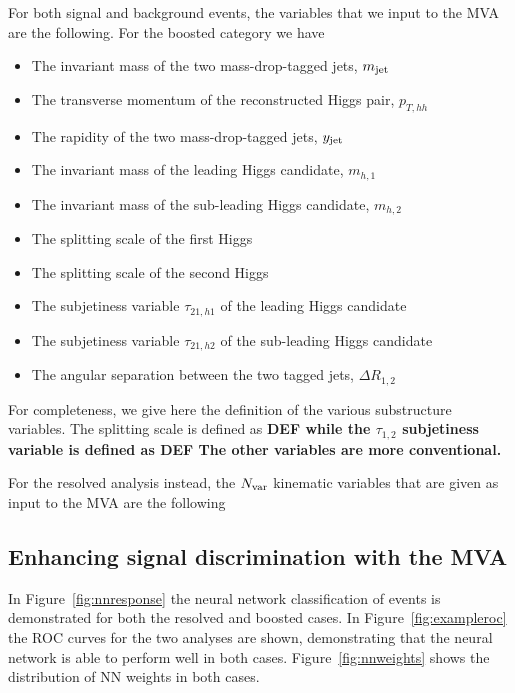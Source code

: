 For both signal and background events, the variables that we input
to the MVA are the following.
%
For the boosted category we have
\begin{itemize}
\item The invariant mass of the two mass-drop-tagged jets, $m_{\rm jet}$
\item The transverse momentum of the reconstructed Higgs pair, $p_{T,hh}$
\item The rapidity of the two mass-drop-tagged jets, $y_{\rm jet}$
\item The invariant mass of the leading Higgs candidate, $m_{h,1}$
\item The invariant mass of the sub-leading Higgs candidate, $m_{h,2}$
\item The splitting scale of the first Higgs
\item The splitting scale of the second Higgs
\item The subjetiness variable $\tau_{21,h1}$ of the leading Higgs candidate
\item The subjetiness variable $\tau_{21,h2}$
  of the sub-leading Higgs candidate
 \item The angular separation between the two tagged jets, $\Delta R_{1,2}$ 
\end{itemize}
For completeness, we give here the definition of the various substructure variables.
%
The splitting scale is defined as
\be
\bf DEF
\ee
while the $\tau_{1,2}$ subjetiness variable is defined as
\be
\bf DEF
\ee
The other variables are more conventional.

For the resolved analysis instead, the $N_{\rm var}$ kinematic variables
that are given as input to the MVA are the following
\begin{itemize}

  \end{itemize}

\subsection{Enhancing signal discrimination with the MVA}


In Figure~\ref{fig:nnresponse} the neural network classification of events is demonstrated for both the resolved and boosted cases. In Figure~\ref{fig:exampleroc} the ROC curves for the two analyses are shown, demonstrating that the neural network is able to
perform well in both cases. Figure~\ref{fig:nnweights} shows the distribution of NN weights in both cases.


